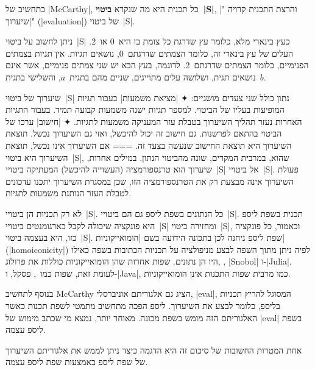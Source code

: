 בתחשיב של \E|McCarthy|, כל תכנית היא מה שנקרא \textbf{ביטוי~\E|S|}, והרצת
התכנית קרויה "\ע|שיערוך|" (\E|evaluation|) של ביטוי~\E|S|.

ניתן לחשוב על ביטוי~\E|S| כעץ בינארי מלא, כלומר עץ שדרגת כל צומת בו היא~0 או~2.
העלים של עץ בינארי זה, כלומר הצמתים שדרגתם~0, נושאים תגיות. אין תגיות בצמתים
הפנימיים, כלומר הצמתים שדרגתם~2. לדוגמה, בעץ הבא יש שני צמתים פנימיים, אשר אינם
נושאים תגית, ושלושה עלים
מתוייגים, שניים מהם
בתגית~$a$, והשלישי בתגית~$b$.
\begin{quote}
  \center
\end{quote}

שיערוך של ביטוי~\E|S| נתון כולל שני צעדים מושגיים:
✦ \ע|מציאת משמעות| בעבור תגיות המופיעות בעליו של הביטוי. למספר תגיות ישנה
משמעות קבועה תמיד. בעבור התגיות האחרות נעזר תהליך השיערוך בטבלת עזר המעניקה
משמעות לתגיות.
✦ \ע|חישוב| ערכו של הביטוי בהתאם לפרשנות. גם חישוב זה יכול להיכשל, ואזי גם
השיערוך נכשל. תוצאת השיערוך היא תוצאת החישוב שנעשה בצעד זה.
===
אם השיערוך אינו נכשל, תוצאת השיערוך היא ביטוי~\E|S|, שהוא, במרבית המקרים, שונה
מהביטוי הנתון. במילים אחרות, שיערוך הוא טרנספורמציה (העשוייה להיכשל) המעתיקה
ביטויי~\E|S| אל ביטויי~\E|S|. פעולת השיערוך אינה מבצעת רק את הטרנספורמציה הזו,
שכן במסגרת השיערוך יתכנו עדכונים לטבלת העזר הנותנת משמעות לתגיות.

לא רק תכניות הן ביטויי~\E|S|. כל הנתונים בשפת ליספ גם הם ביטויי~\E|S|. תכנית
בשפת ליספ היא פונקציה שיכולה לקבל כארגומנטים ביטויי~\E|S| ומחזירה ביטוי~\E|S|,
וכאמור, כל פונקציה כזו, היא בעצמה ביטוי~\E|S|. שפת ליספ ניחנה לכן בתכונה הידועה
בשם \ע|הומואייקוניות| (\E|homoiconicity|) לפיה ניתן מתוך השפה לבצע מניפולציה על
תכניות הכתובות בשפה כאילו היו הן נתונים. שפות אחרות שהן הומואייקוניות כוללות את
פרולוג, , \E|Snobol| ו-\E|Julia|. לעומת זאת, שפות
כמו~\CPL, פסקל, ו-\E|Java|, כמו מרבית שפות התכנות אינן הומואייקוניות.

בנוסף לתחשיב McCarthy הציג גם אלגוריתם אוניברסלי, \E|eval|, המסוגל להריץ תכניות
בליספ, כלומר לבצע את השיערוך. ליספ הפכה מתחשיב מתמטי לשפת תכנות כאשר האלגוריתם
הזה מומש בשפת מכונה. מאוחר יותר, נמצא מי שכתב מימוש של \E|eval| בשפת ליספ עצמה.

אחת המטרות החשובות של סיכום זה היא הדגמה כיצד ניתן לממש את אלגוריתם השיערוך של
שפת ליספ באמצעות שפת ליספ עצמה.

